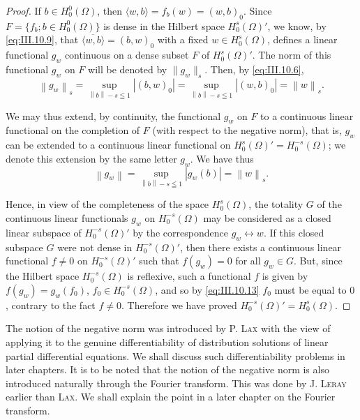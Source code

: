 \begin{proof}
 If $b \in H_0^0(\Omega)$, then $\langle w, b \rangle = f_b(w) = (w, b)_0$. Since $F = \{f_b; b \in H_0^0(\Omega)\}$ is dense in the Hilbert space $H_0^s(\Omega)'$, we know, by \eqref{eq:III.10.9}, that $\overline{\langle w, b \rangle} = (b, w)_0$ with a fixed $w \in H_0^s(\Omega)$, defines a linear functional $g_w$ continuous on a dense subset $F$ of $H_0^s(\Omega)'$. The norm of this functional $g_w$ on $F$ will be denoted by $\|g_w\|_s$. Then, by \eqref{eq:III.10.6}, 
\begin{equation}\label{eq:III.10.12}
\left\| g _{w} \right\| _{s} = \sup\limits _{\left\| b \right\| - s \leqq 1} \left| (b, w) _{0} \right| = \sup\limits _{\left\| b \right\| - s \leqq 1} \left| (w, b) _{0} \right| = \left\| w \right\| _{s}. \end{equation}

We may thus extend, by continuity, the functional $g_{w}$ on $F$ to a continuous linear functional on the completion of $F$ (with respect to the negative norm), that is, $g_{w}$ can be extended to a continuous linear functional on $H_{0}^{s}(\Omega)' = H_{0}^{-s}(\Omega)$; we denote this extension by the same letter $g_{w}$. We have thus 
\begin{equation}\label{eq:III.10.13}
\left\| g _{w} \right\| = \sup\limits _{\left\| b \right\| - s \leqq 1} \left| g _{w} (b) \right| = \left\| w \right\| _{s}.
\end{equation}

Hence, in view of the completeness of the space $H_0^s(\Omega)$, the totality $G$ of the continuous linear functionals $g_w$ on $H_0^{-s}(\Omega)$ may be considered as a closed linear subspace of $H_0^{-s}(\Omega)'$ by the correspondence $g_w \leftrightarrow w$. If this closed subspace $G$ were not dense in $H_0^{-s}(\Omega)'$, then there exists a continuous linear functional $f \neq 0$ on $H_0^{-s}(\Omega)'$ such that $f(g_w) = 0$ for all $g_w \in G$. But, since the Hilbert space $H_0^{-s}(\Omega)$ is reflexive, such a functional $f$ is given by $f(g_w) = g_w(f_0)$, $f_0 \in H_0^{-s}(\Omega)$, and so by \eqref{eq:III.10.13} $f_0$ must be equal to $0$, contrary to the fact $f \neq 0$. Therefore we have proved $H_0^{-s}(\Omega)' = H_0^s(\Omega)$. 
\end{proof}

\begin{remarku} The notion of the negative norm was introduced by P. \textsc{Lax} with the view of applying it to the genuine differentiability of distribution solutions of linear partial differential equations. We shall discuss such differentiability problems in later chapters. It is to be noted that the notion of the negative norm is also introduced naturally through the Fourier transform. This was done by J. \textsc{Leray} \cite{leray175} earlier than \textsc{Lax}. We shall explain the point in a later chapter on the Fourier transform. 
\end{remarku}


